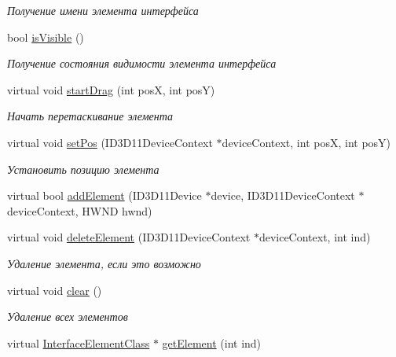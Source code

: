 \begin{DoxyCompactItemize}
\begin{DoxyCompactList}\small\item\em Получение имени элемента интерфейса \end{DoxyCompactList}\item 
bool \hyperlink{class_interface_element_class_a8d2250d84fd5bd69683dd3fe98becafd}{is\+Visible} ()
\begin{DoxyCompactList}\small\item\em Получение состояния видимости элемента интерфейса \end{DoxyCompactList}\item 
virtual void \hyperlink{class_interface_element_class_a4eabfb2943783e107dfe0aaa6a08da62}{start\+Drag} (int posX, int posY)
\begin{DoxyCompactList}\small\item\em Начать перетаскивание элемента \end{DoxyCompactList}\item 
virtual void \hyperlink{class_interface_element_class_a15833d13e7a9c045032bf8498f25b9e6}{set\+Pos} (I\+D3\+D11\+Device\+Context $\ast$device\+Context, int posX, int posY)
\begin{DoxyCompactList}\small\item\em Установить позицию элемента \end{DoxyCompactList}\item 
virtual bool \hyperlink{class_interface_element_class_a1d9f9ffdb2f5e00c78d692ccfe50ce2f}{add\+Element} (I\+D3\+D11\+Device $\ast$device, I\+D3\+D11\+Device\+Context $\ast$device\+Context, H\+W\+ND hwnd)
\item 
virtual void \hyperlink{class_interface_element_class_ab8f17e3c917732a8d2ef85cb0cd65eda}{delete\+Element} (I\+D3\+D11\+Device\+Context $\ast$device\+Context, int ind)
\begin{DoxyCompactList}\small\item\em Удаление элемента, если это возможно \end{DoxyCompactList}\item 
virtual void \hyperlink{class_interface_element_class_a0bc6d608e1d1c6bebb6507b7f9a8a220}{clear} ()
\begin{DoxyCompactList}\small\item\em Удаление всех элементов \end{DoxyCompactList}\item 
virtual \hyperlink{class_interface_element_class}{Interface\+Element\+Class} $\ast$ \hyperlink{class_interface_element_class_aee5a321eaf772ef561bab59b51fb36b9}{get\+Element} (int ind)

\end{DoxyCompactItemize}
